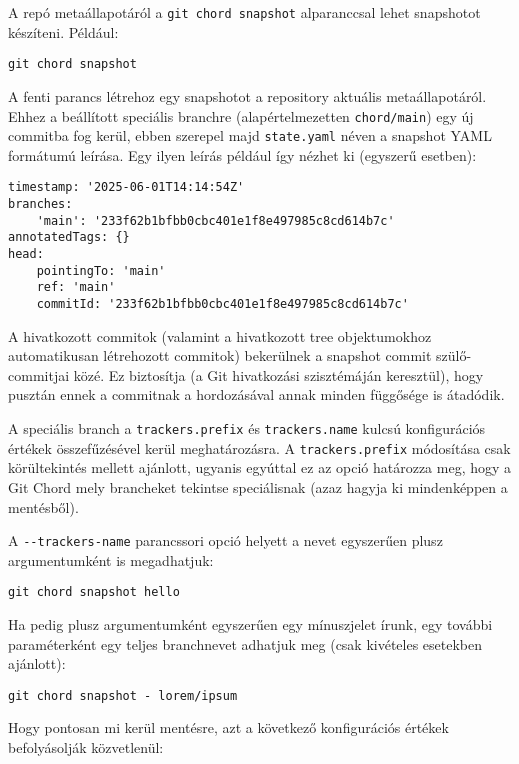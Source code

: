 \documentclass[final]{elteikthesis}[2025/03/25]
\begin{document}
A repó metaállapotáról a \verb|git chord snapshot| alparanccsal lehet snapshotot készíteni.
Például:

\begin{verbatim}
git chord snapshot
\end{verbatim}

A fenti parancs létrehoz egy snapshotot a repository aktuális metaállapotáról.
Ehhez a beállított speciális branchre (alapértelmezetten \verb|chord/main|) egy új commitba fog kerül,
ebben szerepel majd \verb|state.yaml| néven a snapshot YAML formátumú leírása.
Egy ilyen leírás például így nézhet ki (egyszerű esetben):

\begin{verbatim}
timestamp: '2025-06-01T14:14:54Z'
branches:
    'main': '233f62b1bfbb0cbc401e1f8e497985c8cd614b7c'
annotatedTags: {}
head:
    pointingTo: 'main'
    ref: 'main'
    commitId: '233f62b1bfbb0cbc401e1f8e497985c8cd614b7c'
\end{verbatim}

A hivatkozott commitok (valamint a hivatkozott tree objektumokhoz automatikusan létrehozott commitok)
bekerülnek a snapshot commit szülő-commitjai közé.
Ez biztosítja (a Git hivatkozási szisztémáján keresztül),
hogy pusztán ennek a commitnak a hordozásával annak minden függősége is átadódik.

A speciális branch a \verb|trackers.prefix| és \verb|trackers.name| kulcsú konfigurációs értékek összefűzésével kerül meghatározásra.
A \verb|trackers.prefix| módosítása csak körültekintés mellett ajánlott,
ugyanis egyúttal ez az opció határozza meg,
hogy a Git Chord mely brancheket tekintse speciálisnak
(azaz hagyja ki mindenképpen a mentésből).

A \verb|--trackers-name| parancssori opció helyett a nevet egyszerűen plusz argumentumként is megadhatjuk:

\begin{verbatim}
git chord snapshot hello
\end{verbatim}

Ha pedig plusz argumentumként egyszerűen egy mínuszjelet írunk,
egy további paraméterként egy teljes branchnevet adhatjuk meg (csak kivételes esetekben ajánlott):

\begin{verbatim}
git chord snapshot - lorem/ipsum
\end{verbatim}

Hogy pontosan mi kerül mentésre, azt a következő konfigurációs értékek befolyásolják közvetlenül:
\end{document}
